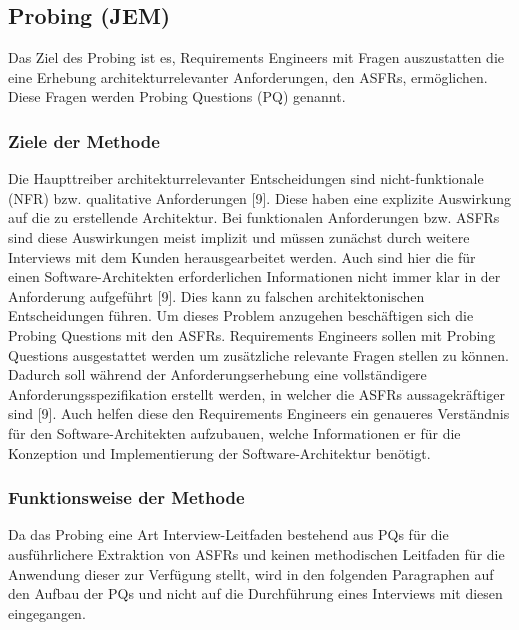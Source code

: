 \subsection{Probing (JEM)}

Das Ziel des Probing ist es, Requirements Engineers mit Fragen auszustatten die eine Erhebung architekturrelevanter Anforderungen, den ASFRs, ermöglichen. Diese Fragen werden Probing Questions (PQ) genannt. \\

\subsubsection{Ziele der Methode}

Die Haupttreiber architekturrelevanter Entscheidungen sind nicht-funktionale (NFR) bzw. qualitative Anforderungen [9]. Diese haben eine explizite Auswirkung auf die zu erstellende Architektur. Bei funktionalen Anforderungen bzw. ASFRs sind diese Auswirkungen meist implizit und müssen zunächst durch weitere Interviews mit dem Kunden herausgearbeitet werden. Auch sind hier die für einen Software-Architekten erforderlichen Informationen nicht immer klar in der Anforderung aufgeführt [9]. Dies kann zu falschen architektonischen Entscheidungen führen. Um dieses Problem anzugehen beschäftigen sich die Probing Questions mit den ASFRs. Requirements Engineers sollen mit Probing Questions ausgestattet werden um zusätzliche relevante Fragen stellen zu können. Dadurch soll während der Anforderungserhebung eine vollständigere Anforderungsspezifikation erstellt werden, in welcher die ASFRs aussagekräftiger sind [9]. Auch helfen diese den Requirements Engineers ein genaueres Verständnis für den Software-Architekten aufzubauen, welche Informationen er für die Konzeption und Implementierung der Software-Architektur benötigt. \\

\subsubsection{Funktionsweise der Methode}

Da das Probing eine Art Interview-Leitfaden bestehend aus PQs für die ausführlichere Extraktion von ASFRs und keinen methodischen Leitfaden für die Anwendung dieser zur Verfügung stellt, wird in den folgenden Paragraphen auf den Aufbau der PQs und nicht auf die Durchführung eines Interviews mit diesen eingegangen. \\

